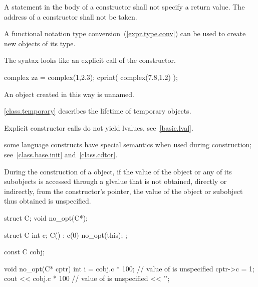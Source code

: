 \pnum
{}%
A
statement in the body of a constructor shall not specify a return value.
%
The address of a constructor shall not be taken.

\pnum
{}%
%
A functional notation type conversion~(\ref{expr.type.conv}) can be used
to create new objects of its type.
\begin{note}
The syntax looks like an explicit call of the constructor.
\end{note}
\begin{example}
%

\begin{codeblock}
complex zz = complex(1,2.3);
cprint( complex(7.8,1.2) );
\end{codeblock}
\end{example}

\pnum
An object created in this way is unnamed.
\begin{note}
\ref{class.temporary} describes the lifetime of temporary objects.
\end{note}
\begin{note}
Explicit constructor calls do not yield lvalues, see~\ref{basic.lval}.
\end{note}

\pnum
\begin{note}
%
some language constructs have special semantics when used during construction;
see~\ref{class.base.init} and~\ref{class.cdtor}.
\end{note}

\pnum
During the construction of a
object, if the value of the object or any of its subobjects is
accessed through a glvalue that is not obtained, directly or indirectly, from
the constructor's
pointer, the value of the object or subobject thus obtained is unspecified.
\begin{example}

\begin{codeblock}
struct C;
void no_opt(C*);

struct C {
  int c;
  C() : c(0) { no_opt(this); }
};

const C cobj;

void no_opt(C* cptr) {
  int i = cobj.c * 100;         // value of  is unspecified
  cptr->c = 1;
  cout << cobj.c * 100          // value of  is unspecified
       << '\n';
}
\end{codeblock}
\end{example}

